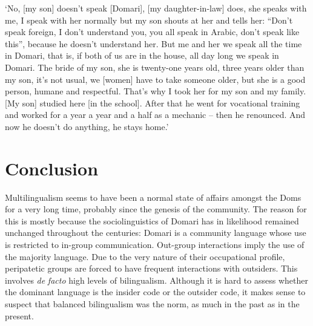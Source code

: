 \documentclass[output=paper]{langsci/langscibook}
\begin{document}
\glt ‘No, [my son] doesn’t speak [Domari], [my daughter-in-law] does, she speaks with me, I speak with her normally but my son shouts at her and tells her: “Don’t speak foreign, I don’t understand you, you all speak in Arabic, don’t speak like this”, because he doesn’t understand her. But me and her we speak all the time in Domari, that is, if both of us are in the house, all day long we speak in Domari. The bride of my son, she is twenty-one years old, three years older than my son, it’s not usual, we [women] have to take someone older, but she is a good person, humane and respectful. That’s why I took her for my son and my family. [My son] studied here [in the school]. After that he went for vocational training and worked for a year a year and a half as a mechanic -- then he renounced. And now he doesn’t do anything, he stays home.’ 
\z

\section{Conclusion}

Multilingualism seems to have been a normal state of affairs amongst the Doms for a very long time, probably since the genesis of the community. The reason for this is mostly because the sociolinguistics of Domari has in likelihood remained unchanged throughout the centuries: Domari is a community language whose use is restricted to in-group communication. Out-group interactions imply the use of the majority language. Due to the very nature of their occupational profile, peripatetic groups are forced to have frequent interactions with outsiders. This involves \textit{de} \textit{facto} high levels of bilingualism. Although it is hard to assess whether the dominant language is the insider code or the outsider code, it makes sense to suspect that balanced bilingualism was the norm, as much in the past as in the present.
\end{document}
